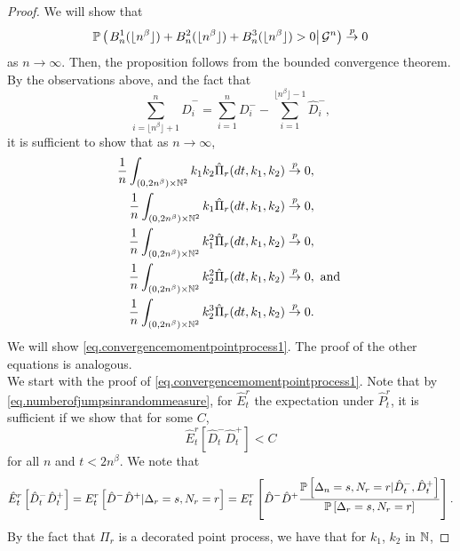 \begin{proof}
We will show that \begin{equation}\label{eq.conditionalprobanamolousedges}\P\left(\left.B^1_n(\lfloor n^\beta \rfloor)+B^2_n(\lfloor n^\beta \rfloor)+B^3_n(\lfloor n^\beta \rfloor)>0\right| \cG^n \right)\overset{p}{\to}0\end{equation} as $n\to\infty$. Then, the proposition follows from the bounded convergence theorem. By the observations above, and the fact that $$\sum_{i=\lfloor n^\beta \rfloor+1}^n \hat{D}^-_i=\sum_{i=1}^n D^-_i-\sum_{i=1}^{\lfloor n^\beta \rfloor -1}\hat{D}^-_i,$$ it is sufficient to show that as $n\to \infty$,
\begin{align}
\frac{1}{n}\int_{(0,2n^\beta)\times \N^2}k_1k_2 \hat{\Pi}_r(dt,k_1,k_2)&\overset{p}{\to}0,\label{eq.convergencemomentpointprocess1}\\
\frac{1}{n}\int_{(0,2n^\beta)\times \N^2}k_1 \hat{\Pi}_r(dt,k_1,k_2)&\overset{p}{\to}0,\label{eq.convergencemomentpointprocess2}\\
\frac{1}{n}\int_{(0,2n^\beta)\times \N^2}k_1^2 \hat{\Pi}_r(dt,k_1,k_2)&\overset{p}{\to}0,\label{eq.convergencemomentpointprocess3}\\
\frac{1}{n}\int_{(0,2n^\beta)\times \N^2}k_2^2 \hat{\Pi}_r(dt,k_1,k_2)&\overset{p}{\to}0,\text{ and }\label{eq.convergencemomentpointprocess4}\\
\frac{1}{n}\int_{(0,2n^\beta)\times \N^2}k_2^3 \hat{\Pi}_r(dt,k_1,k_2)&\overset{p}{\to}0.\label{eq.convergencemomentpointprocess5}\end{align}
We will show \ref{eq.convergencemomentpointprocess1}. The proof of the other equations is analogous. \\
We start with the proof of \ref{eq.convergencemomentpointprocess1}. Note that by \eqref{eq.numberofjumpsinrandommeasure}, for $\hat{E}^r_t$ the expectation under $\hat{P}^r_t$, it is sufficient if we show that for some $C$,
\begin{equation}\label{eq.expectationtobound}{\hat{E}}^r_t\left[\hat{D}^-_t\hat{D}^+_t\right]
<C\end{equation}
for all $n$ and $t<2n^\beta$. We note that
$${\hat{E}}^r_t\left[\hat{D}^-_t\hat{D}^+_t\right]={E}^r_t\left[\hat{D}^-\hat{D}^+| \Delta_r=s, N_r=r\right]={E}^r_t\left[\hat{D}^-\hat{D}^+\frac{\P\left[ \Delta_n=s, N_r=r | \hat{D}^-_t,\hat{D}^+_t\right]}{\P\left[ \Delta_r=s, N_r=r\right]}\right].$$
By the fact that $\Pi_r$ is a decorated point process, we have that for $k_1$, $k_2$ in $\N$, 

\end{proof}
